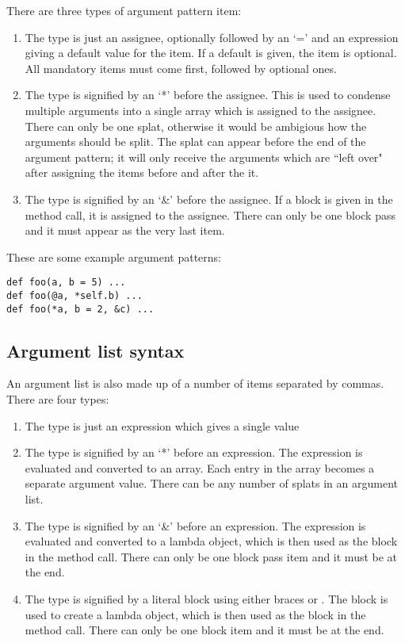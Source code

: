 There are three types of argument pattern item:

\begin{enumerate}
  \item The  type is just an assignee, optionally followed by an `=' and an expression giving a default value for the item. If a default is given, the item is optional. All mandatory items must come first, followed by optional ones.
  
  \item The  type is signified by an `*' before the assignee. This is used to condense multiple arguments into a single array which is assigned to the assignee. There can only be one splat, otherwise it would be ambigious how the arguments should be split. The splat can appear before the end of the argument pattern; it will only receive the arguments which are ``left over" after assigning the items before and after the it.
  
  \item The  type is signified by an `\&' before the assignee. If a block is given in the method call, it is assigned to the assignee. There can only be one block pass and it must appear as the very last item.
\end{enumerate}

These are some example argument patterns:

\begin{lstlisting}
def foo(a, b = 5) ...
def foo(@a, *self.b) ...
def foo(*a, b = 2, &c) ...
\end{lstlisting}

\subsection{Argument list syntax}

An argument list is also made up of a number of items separated by commas. There are four types:

\begin{enumerate}
  \item The  type is just an expression which gives a single value
  \item The  type is signified by an `*' before an expression. The expression is evaluated and converted to an array. Each entry in the array becomes a separate argument value. There can be any number of splats in an argument list.
  \item The  type is signified by an `\&' before an expression. The expression is evaluated and converted to a lambda object, which is then used as the block in the method call. There can only be one block pass item and it must be at the end.
  \item The  type is signified by a literal block using either braces or   . The block is used to create a lambda object, which is then used as the block in the method call. There can only be one block item and it must be at the end.
\end{enumerate}

